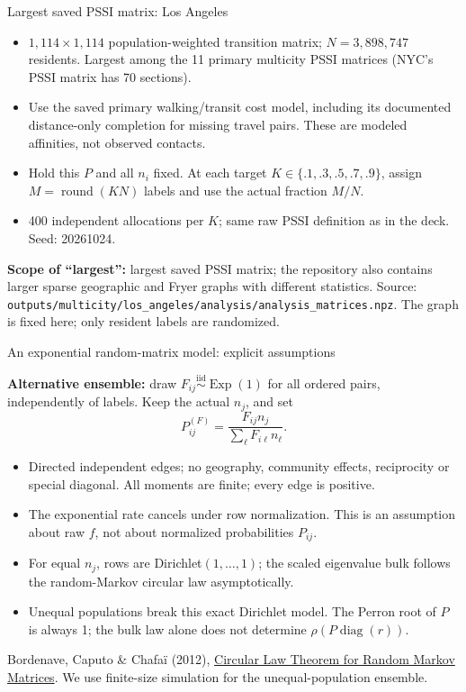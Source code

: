 \begin{frame}{Largest saved PSSI matrix: Los Angeles}
\small

\begin{itemize}
\item $1{,}114\times1{,}114$ population-weighted transition matrix; $N=3{,}898{,}747$ residents. Largest among the 11 primary multicity PSSI matrices (NYC's PSSI matrix has 70 sections).
\item Use the saved primary walking/transit cost model, including its documented distance-only completion for missing travel pairs. These are modeled affinities, not observed contacts.
\item Hold this $P$ and all $n_i$ fixed. At each target $K\in\{.1,.3,.5,.7,.9\}$, assign $M=\operatorname{round}(KN)$ labels and use the actual fraction $M/N$.
\item 400 independent allocations per $K$; same raw PSSI definition as in the deck. Seed: 20261024.
\end{itemize}
\medskip
\textbf{Scope of ``largest'':} largest saved PSSI matrix; the repository also contains larger sparse geographic and Fryer graphs with different statistics.
\medskip
\footnotesize Source: \texttt{outputs/multicity/los\_angeles/analysis/analysis\_matrices.npz}. The graph is fixed here; only resident labels are randomized.

\end{frame}

\begin{frame}{An exponential random-matrix model: explicit assumptions}
\small

\textbf{Alternative ensemble:} draw $F_{ij}\overset{\mathrm{iid}}\sim\operatorname{Exp}(1)$ for all ordered pairs, independently of labels. Keep the actual $n_j$, and set
\[
 P^{(F)}_{ij}=\frac{F_{ij}n_j}{\sum_\ell F_{i\ell}n_\ell}.
\]
\begin{itemize}
\item Directed independent edges; no geography, community effects, reciprocity or special diagonal. All moments are finite; every edge is positive.
\item The exponential rate cancels under row normalization. This is an assumption about raw $f$, not about normalized probabilities $P_{ij}$.
\item For equal $n_j$, rows are Dirichlet$(1,\ldots,1)$; the scaled eigenvalue bulk follows the random-Markov circular law asymptotically.
\item Unequal populations break this exact Dirichlet model. The Perron root of $P$ is always 1; the bulk law alone does not determine $\rho(P\operatorname{diag}(r))$.
\end{itemize}
\footnotesize Bordenave, Caputo \& Chafa\"i (2012), \href{https://arxiv.org/abs/0808.1502}{Circular Law Theorem for Random Markov Matrices}. We use finite-size simulation for the unequal-population ensemble.

\end{frame}

